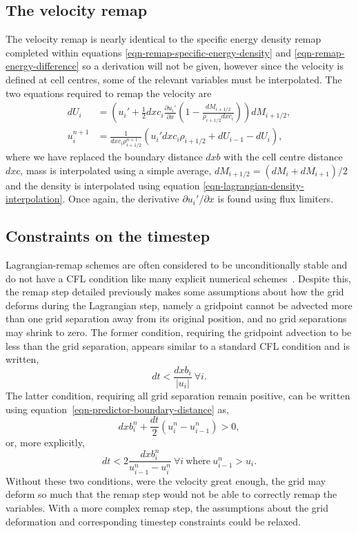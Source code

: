 \subsection{The velocity remap}
\label{sec-remap-velocity}
The velocity remap is nearly identical to the specific energy density remap completed within equations \eqref{eqn-remap-specific-energy-density} and \eqref{eqn-remap-energy-difference} so a derivation will not be given, however since the velocity is defined at cell centres, some of the relevant variables must be interpolated. The two equations required to remap the velocity are 
\begin{align}
  dU_i &= \left( u_i' + \frac{1}{2}dxc_i\frac{\partial u_i'}{\partial x} \left( 1 - \frac{dM_{i+1/2}}{\rho_{i+1/2} dxc_i} \right) \right)dM_{i+1/2},\\
  u_i^{n+1}  &= \frac{1}{dxc_i \rho_{i+1/2}^{n+1}}(u_i' dxc_i \rho_{i+1/2} + dU_{i-1} - dU_i),
\end{align}
where we have replaced the boundary distance $dxb$ with the cell centre distance $dxc$, mass is interpolated using a simple average, $dM_{i+1/2} = (dM_{i} + dM_{i+1})/2$ and the density is interpolated using equation \eqref{eqn-lagrangian-density-interpolation}. Once again, the derivative $\partial u_i' / \partial x$ is found using flux limiters. 

\subsection{Constraints on the timestep}
Lagrangian-remap schemes are often considered to be unconditionally stable and do not have a CFL condition like many explicit numerical schemes~\cite{batesMultiplyUpstreamSemiLagrangianAdvective1982}. Despite this, the remap step detailed previously makes some assumptions about how the grid deforms during the Lagrangian step, namely a gridpoint cannot be advected more than one grid separation away from its original position, and no grid separations may shrink to zero. The former condition, requiring the gridpoint advection to be less than the grid separation, appears similar to a standard CFL condition and is written,
\begin{equation}
  \label{eq:grid_condition1}
  dt < \frac{dxb_i}{|u_i|}\ \forall i.
\end{equation}
The latter condition, requiring all grid separation remain positive, can be written using equation~\ref{eqn-predictor-boundary-distance} as,
\begin{equation}
  \label{}
  dxb_i^n + \frac{dt}{2}(u_i^n - u_{i-1}^n) > 0,
\end{equation}
or, more explicitly,
\begin{equation}
  \label{eq:grid_condition2}
  dt < 2\frac{dxb_i^n}{u_{i-1}^n - u_{i}^n}\ \forall i\  \text{where}\ u_{i-1}^n > u_{i}.
\end{equation}
Without these two conditions, were the velocity great enough, the grid may deform so much that the remap step would not be able to correctly remap the variables. With a more complex remap step, the assumptions about the grid deformation and corresponding timestep constraints could be relaxed.

